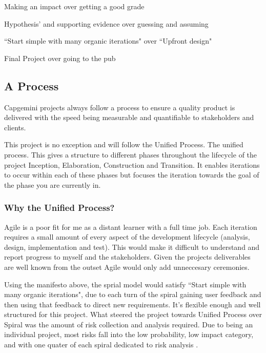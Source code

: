 \begin{center}
Making an impact over getting a good grade

Hypothesis’ and supporting evidence over guessing and assuming

``Start simple with many organic iterations" over ``Upfront design"

Final Project over going to the pub
\end{center}

\subsection{A Process}
Capgemini projects always follow a process to ensure a quality
product is delivered with the speed being measurable and quantifiable to
stakeholders and clients.

This project is no exception and will follow the Unified Process. The unified
process. This gives a structure to different phases throughout the lifecycle of
the project Inception, Elaboration, Construction and Transition. It enables
iterations to occur within each of these phases but focuses the iteration
towards the goal of the phase you are currently in.

\subsubsection{Why the Unified Process?}

Agile is a poor fit for me as a distant learner with a
full time job. Each iteration requires a small amount of every aspect of the
development lifecycle (analysis, design, implementation and test). This would
make it difficult to understand and report progress to myself and the
stakeholders. Given the projects deliverables are well known from
the outset Agile would only add unneccesary ceremonies.

Using the manifesto above, the sprial model would satisfy ``Start simple with
many organic iterations", due to each turn of the spiral gaining user feedback
and then using that feedback to direct new requirements. It's flexible enough
 and well structured for this project. What steered the project towards Unified
 Process over Spiral was the amount of risk
collection and analysis required. Due to being an individual project, most
risks fall into the low probability, low impact category, and with one quater of
each spiral dedicated to risk analysis .

